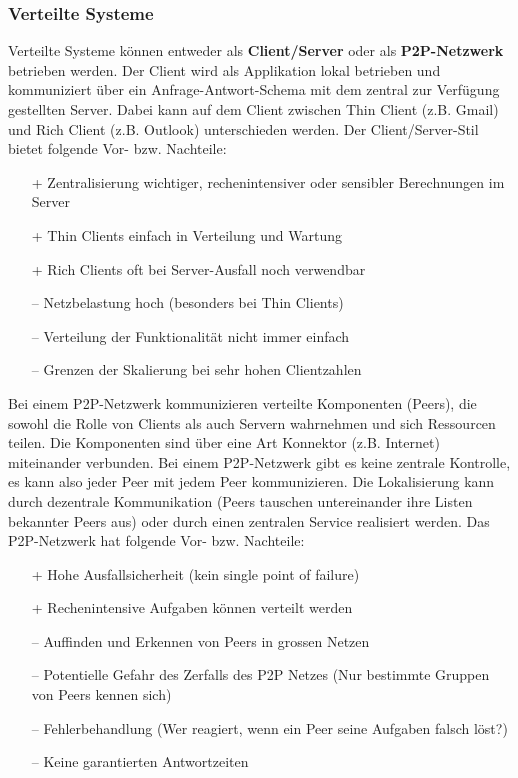 \subsubsection{Verteilte Systeme}

Verteilte Systeme können entweder als \textbf{Client/Server} oder als \textbf{P2P-Netzwerk} betrieben werden. Der Client wird als Applikation lokal betrieben und kommuniziert über ein Anfrage-Antwort-Schema mit dem zentral zur Verfügung gestellten Server. Dabei kann auf dem Client zwischen Thin Client (z.B. Gmail) und Rich Client (z.B. Outlook) unterschieden werden. Der Client/Server-Stil bietet folgende Vor- bzw. Nachteile:
\begin{itemize}
	\item[+] Zentralisierung wichtiger, rechenintensiver oder sensibler Berechnungen im Server
	\item[+] Thin Clients einfach in Verteilung und Wartung
	\item[+] Rich Clients oft bei Server-Ausfall noch verwendbar
	\item[--] Netzbelastung hoch (besonders bei Thin Clients)
	\item[--] Verteilung der Funktionalität nicht immer einfach
	\item[--] Grenzen der Skalierung bei sehr hohen Clientzahlen
\end{itemize}

Bei einem P2P-Netzwerk kommunizieren verteilte Komponenten (Peers), die sowohl die Rolle von Clients als auch Servern wahrnehmen und sich Ressourcen teilen. Die Komponenten sind über eine Art Konnektor (z.B. Internet) miteinander verbunden. Bei einem P2P-Netzwerk gibt es keine zentrale Kontrolle, es kann also jeder Peer mit jedem Peer kommunizieren. Die Lokalisierung kann durch dezentrale Kommunikation (Peers tauschen untereinander ihre Listen bekannter Peers aus) oder durch einen zentralen Service realisiert werden. Das P2P-Netzwerk hat folgende Vor- bzw. Nachteile:
\begin{itemize}
	\item[+] Hohe Ausfallsicherheit (kein single point of failure)
	\item[+] Rechenintensive Aufgaben können verteilt werden
	\item[--] Auffinden und Erkennen von Peers in grossen Netzen
	\item[--] Potentielle Gefahr des Zerfalls des P2P Netzes (Nur bestimmte Gruppen von Peers kennen sich)
	\item[--] Fehlerbehandlung (Wer reagiert, wenn ein Peer seine Aufgaben falsch löst?)
	\item[--] Keine garantierten Antwortzeiten
\end{itemize}


